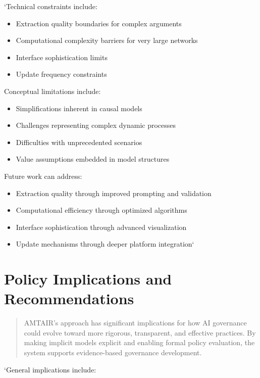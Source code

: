 \documentclass[12pt,a4paper]{report}
\providecommand{\tightlist}{%
  \setlength{\itemsep}{0pt}\setlength{\parskip}{0pt}}
\begin{document}
`Technical constraints include:

\begin{itemize}
\tightlist
\item
  Extraction quality boundaries for complex arguments
\item
  Computational complexity barriers for very large networks
\item
  Interface sophistication limits
\item
  Update frequency constraints
\end{itemize}

Conceptual limitations include:

\begin{itemize}
\tightlist
\item
  Simplifications inherent in causal models
\item
  Challenges representing complex dynamic processes
\item
  Difficulties with unprecedented scenarios
\item
  Value assumptions embedded in model structures
\end{itemize}

Future work can address:

\begin{itemize}
\tightlist
\item
  Extraction quality through improved prompting and validation
\item
  Computational efficiency through optimized algorithms
\item
  Interface sophistication through advanced visualization
\item
  Update mechanisms through deeper platform integration`
\end{itemize}

\section{Policy Implications and
Recommendations}\label{sec-policy-implications}

\begin{quote}
AMTAIR's approach has significant implications for how AI governance
could evolve toward more rigorous, transparent, and effective practices.
By making implicit models explicit and enabling formal policy
evaluation, the system supports evidence-based governance development.
\end{quote}

`General implications include:
\end{document}
